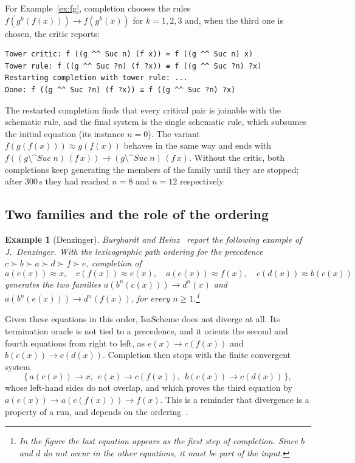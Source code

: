 \documentclass[preprint,12pt]{elsarticle}
\newtheorem{example}{Example}
\newcommand{\rw}{\to}
\newcommand{\pw}[2]{#1^{#2}}               %
\newcommand{\pp}{\mathbin{\texttt{\^{}\^{}}}}     %
\newcommand{\fp}[2]{(#1 \pp #2)}                  %
\newcommand{\Suc}{\mathit{Suc}}
\begin{document}
For Example~\ref{ex:fg}, completion chooses the rules
$f(\pw{g}{k}(f(x))) \rw f(\pw{g}{k}(x))$ for $k = 1, 2, 3$ and, when the
third one is chosen, the critic reports:
\begin{lstlisting}[language={}]
Tower critic: f ((g ^^ Suc n) (f x)) = f ((g ^^ Suc n) x)
Tower rule: f ((g ^^ Suc ?n) (f ?x)) ≡ f ((g ^^ Suc ?n) ?x)
Restarting completion with tower rule: ...
Done: f ((g ^^ Suc ?n) (f ?x)) ≡ f ((g ^^ Suc ?n) ?x)
\end{lstlisting}
The restarted completion finds that every critical pair is joinable with
the schematic rule, and the final system is the single schematic rule,
which subsumes the initial equation (its instance $n = 0$). The variant
$f(g(f(x))) \approx g(f(x))$ behaves in the same way and ends with
$f(\fp{g}{\Suc\;n}\,(f\,x)) \rw \fp{g}{\Suc\;n}\,(f\,x)$. Without the
critic, both completions keep generating the members of the family until
they are stopped; after 300\,s they had reached $n = 8$ and $n = 12$
respectively.

\subsection{Two families and the role of the ordering}

\begin{example}[Denzinger]\label{ex:denzinger}
Burghardt and Heinz~\cite[Fig.~48]{BurghardtHeinz96} report the following
example of J.~Denzinger. With the lexicographic path ordering for the
precedence $c \succ b \succ a \succ d \succ f \succ e$, completion of
\[
  a(c(x)) \approx x,\quad c(f(x)) \approx e(x),\quad
  a(e(x)) \approx f(x),\quad c(d(x)) \approx b(c(x))
\]
generates the two families $a(\pw{b}{n}(c(x))) \rw \pw{d}{n}(x)$ and
$a(\pw{b}{n}(e(x))) \rw \pw{d}{n}(f(x))$, for every
$n \ge 1$.\footnote{In the figure the last equation appears as the first
step of completion. Since $b$ and $d$ do not occur in the other equations,
it must be part of the input.}
\end{example}

Given these equations in this order, IsaScheme does not diverge at all.
Its termination oracle is not tied to a precedence, and it orients the
second and fourth equations from right to left, as $e(x) \rw c(f(x))$ and
$b(c(x)) \rw c(d(x))$. Completion then stops with the finite convergent
system
\[
  \{\, a(c(x)) \rw x,\ \ e(x) \rw c(f(x)),\ \ b(c(x)) \rw c(d(x)) \,\},
\]
whose left-hand sides do not overlap, and which proves the third equation
by $a(e(x)) \rw a(c(f(x))) \rw f(x)$. This is a reminder that divergence
is a property of a run, and depends on the
ordering~\cite{Lescanne86,Dershowitz89}.
\end{document}
